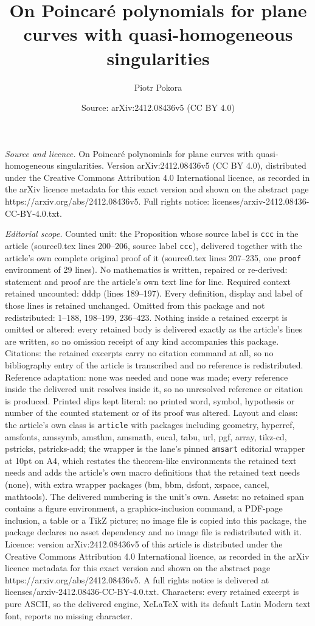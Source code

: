 \documentclass[10pt,a4paper]{amsart}
\title[On Poincar\'e polynomials for plane curves with quasi-homoge]{On Poincar\'e polynomials for plane curves with quasi-homogeneous singularities}
\author{Piotr Pokora}
\date{Source: arXiv:2412.08436v5 (CC BY 4.0)}
\begin{document}
\maketitle

\noindent\emph{Source and licence.} On Poincar\'e polynomials for plane curves with quasi-homogeneous singularities. Version arXiv:2412.08436v5 (CC BY 4.0), distributed under the Creative Commons Attribution 4.0 International licence, as recorded in the arXiv licence metadata for this exact version and shown on the abstract page https://arxiv.org/abs/2412.08436v5. Full rights notice: licenses/arxiv-2412.08436-CC-BY-4.0.txt.\par\smallskip

\noindent\textit{Editorial scope.} Counted unit: the Proposition whose source label is \texttt{ccc} in the article (source0.tex lines 200--206, source label \texttt{ccc}), delivered together with the article's own complete original proof of it (source0.tex lines 207--235, one \texttt{proof} environment of 29 lines). No mathematics is written, repaired or re-derived: statement and proof are the article's own text line for line. Required context retained uncounted: dddp (lines 189--197). Every definition, display and label of those lines is retained unchanged. Omitted from this package and not redistributed: 1--188, 198--199, 236--423. Nothing inside a retained excerpt is omitted or altered: every retained body is delivered exactly as the article's lines are written, so no omission receipt of any kind accompanies this package. Citations: the retained excerpts carry no citation command at all, so no bibliography entry of the article is transcribed and no reference is redistributed. Reference adaptation: none was needed and none was made; every reference inside the delivered unit resolves inside it, so no unresolved reference or citation is produced. Printed slips kept literal: no printed word, symbol, hypothesis or number of the counted statement or of its proof was altered. Layout and class: the article's own class is \texttt{article} with packages including geometry, hyperref, amsfonts, amssymb, amsthm, amsmath, eucal, tabu, url, pgf, array, tikz-cd, pstricks, pstricks-add; the wrapper is the lane's pinned \texttt{amsart} editorial wrapper at 10pt on A4, which restates the theorem-like environments the retained text needs and adds the article's own macro definitions that the retained text needs (none), with extra wrapper packages (bm, bbm, dsfont, xspace, cancel, mathtools). The delivered numbering is the unit's own. Assets: no retained span contains a figure environment, a graphics-inclusion command, a PDF-page inclusion, a table or a TikZ picture; no image file is copied into this package, the package declares no asset dependency and no image file is redistributed with it. Licence: version arXiv:2412.08436v5 of this article is distributed under the Creative Commons Attribution 4.0 International licence, as recorded in the arXiv licence metadata for this exact version and shown on the abstract page https://arxiv.org/abs/2412.08436v5. A full rights notice is delivered at licenses/arxiv-2412.08436-CC-BY-4.0.txt. Characters: every retained excerpt is pure ASCII, so the delivered engine, XeLaTeX with its default Latin Modern text font, reports no missing character.
\end{document}
